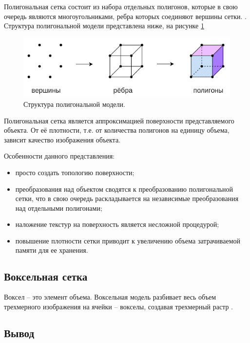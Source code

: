 Полигональная сетка состоит из набора отдельных полигонов, которые в свою очередь являются многоугольниками, ребра которых соединяют вершины сетки. \cite{polygon-net}. Структура полигональной модели представлена ниже, на рисунке \ref{pic:polygon-net}

\begin{figure}[h]
	\centering
	\includegraphics[width=0.8\linewidth]{inc/img/polygon-model.png}
	\caption{Структура полигональной модели.}
	\label{pic:polygon-net}
\end{figure}

Полигональная сетка является аппроксимацией поверхности представляемого объекта. От её плотности, т.е. от количества полигонов на единицу объема, зависит качество изображения объекта.

Особенности данного представления:

\begin{itemize}
	\item просто создать топологию поверхности;
	\item преобразования над объектом сводятся к преобразованию полигональной сетки, что в свою очередь раскладывается на независимые преобразования над отдельными полигонами;
	\item наложение текстур на поверхность является несложной процедурой;
	\item повышение плотности сетки приводит к увеличению объема затрачиваемой памяти для ее хранения.
\end{itemize}

\clearpage

\subsection{Воксельная сетка}

Воксел -- это элемент объема. Воксельная модель разбивает весь объем трехмерного изображения на ячейки -- вокселы, создавая трехмерный растр \cite{voxel}.

\subsection{Вывод}

